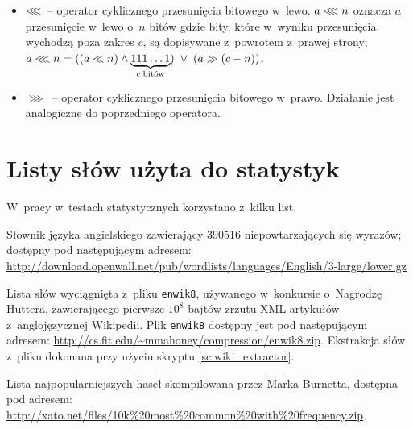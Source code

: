 \documentclass[12pt,a4paper,twoside]{article}
\newcounter{wlcounter} %
\begin{document}
\begin{appendices}
\begin{itemize}
        \item $\llless$~-- operator cyklicznego przesunięcia bitowego w~lewo.
        $a \llless n$ oznacza $a$ przesunięcie w~lewo o~$n$ bitów gdzie bity,
        które w~wyniku przesunięcia wychodzą poza zakres $c$, są dopisywane
        z~powrotem z~prawej strony; $a \llless n =\break ((a \ll n) \land
        \underbrace{111\ldots1}_{c\;\text{bitów}}) \;\lor\; (a \gg (c-n))$.

        \item $\ggg$~-- operator cyklicznego przesunięcia bitowego w~prawo.
        Działanie jest analogiczne do poprzedniego operatora.

    \end{itemize}

\pagebreak
\section{Listy słów użyta do statystyk}
\label{app:wordlists}
W~pracy w~testach statystycznych korzystano z~kilku list.

    \begin{myenumerate}

        \item {}\label{wl:english_wordlist} Słownik
        języka angielskiego zawierający 390516 niepowtarzających się wyrazów;
        dostępny pod następującym adresem:
        \url{http://download.openwall.net/pub/wordlists/languages/English/3-large/lower.gz}

        \item {}\label{wl:wiki_wordlist} Lista słów
        wyciągnięta z~pliku \texttt{enwik8}, używanego w~konkursie o~Nagrodzę
        Huttera, zawierającego pierwsze $10^8$ bajtów zrzutu XML artykułów
        z~anglojęzycznej \mbox{Wikipedii}. Plik \texttt{enwik8} dostępny jest
        pod następującym adresem:
        \url{http://cs.fit.edu/~mmahoney/compression/enwik8.zip}. Ekstrakcja
        słów z~pliku dokonana przy użyciu skryptu \ref{sc:wiki_extractor}.

        \item {}\label{wl:xato_passwords} Lista
         najpopularniejszych haseł skompilowana przez Marka
        Burnetta, dostępna pod adresem:
        \url{http://xato.net/files/10k%20most%20common%20with%20frequency.zip}.

    \end{myenumerate}


\end{appendices}
\end{document}
